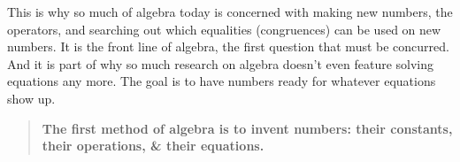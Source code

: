 This is why so much of algebra today is concerned with making new numbers, the
operators, and searching out which equalities (congruences) can be used on new
numbers.  It is the front line of algebra, the first question that must be
concurred.  And it is  part of why so much research on algebra doesn't even
feature solving equations any more.  The goal is to have numbers ready for
whatever equations show up.

\begin{quote}
    \textbf{The first method of algebra is to invent numbers: their constants,
    their operations, \& their equations.}%
\end{quote}
